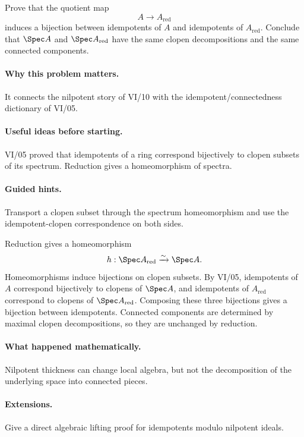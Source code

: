 \begin{problem}
Prove that the quotient map
\[
A\to A_{\mathrm{red}}
\]
induces a bijection between idempotents of $A$ and idempotents of $A_{\mathrm{red}}$.
Conclude that $\Spec A$ and $\Spec A_{\mathrm{red}}$ have the same clopen decompositions
and the same connected components.
\end{problem}
\paragraph{Why this problem matters.}
It connects the nilpotent story of VI/10 with the idempotent/connectedness dictionary of
VI/05.
\paragraph{Useful ideas before starting.}
VI/05 proved that idempotents of a ring correspond bijectively to clopen subsets of its
spectrum.  Reduction gives a homeomorphism of spectra.
\paragraph{Guided hints.}
Transport a clopen subset through the spectrum homeomorphism and use the idempotent-clopen
correspondence on both sides.
\begin{solution}
Reduction gives a homeomorphism
\[
h:\Spec A_{\mathrm{red}}\xrightarrow{\sim}\Spec A.
\]
Homeomorphisms induce bijections on clopen subsets.  By VI/05, idempotents of $A$ correspond
bijectively to clopens of $\Spec A$, and idempotents of $A_{\mathrm{red}}$ correspond to
clopens of $\Spec A_{\mathrm{red}}$.  Composing these three bijections gives a bijection
between idempotents.  Connected components are determined by maximal clopen decompositions,
so they are unchanged by reduction.
\end{solution}
\paragraph{What happened mathematically.}
Nilpotent thickness can change local algebra, but not the decomposition of the underlying
space into connected pieces.
\paragraph{Extensions.}
Give a direct algebraic lifting proof for idempotents modulo nilpotent ideals.
